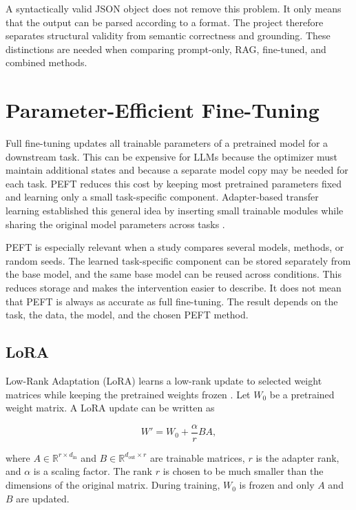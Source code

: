 A syntactically valid JSON object does not remove this problem. It only means that the output can be parsed according to a format. The project therefore separates structural validity from semantic correctness and grounding. These distinctions are needed when comparing prompt-only, RAG, fine-tuned, and combined methods.

\section{Parameter-Efficient Fine-Tuning}

Full fine-tuning updates all trainable parameters of a pretrained model for a downstream task. This can be expensive for LLMs because the optimizer must maintain additional states and because a separate model copy may be needed for each task. PEFT reduces this cost by keeping most pretrained parameters fixed and learning only a small task-specific component. Adapter-based transfer learning established this general idea by inserting small trainable modules while sharing the original model parameters across tasks \cite{houlsby2019adapter}.

PEFT is especially relevant when a study compares several models, methods, or random seeds. The learned task-specific component can be stored separately from the base model, and the same base model can be reused across conditions. This reduces storage and makes the intervention easier to describe. It does not mean that PEFT is always as accurate as full fine-tuning. The result depends on the task, the data, the model, and the chosen PEFT method.

\subsection{LoRA}

Low-Rank Adaptation (LoRA) learns a low-rank update to selected weight matrices while keeping the pretrained weights frozen \cite{hu2022lora}. Let \(W_0\) be a pretrained weight matrix. A LoRA update can be written as

\[
W' = W_0 + \frac{\alpha}{r}BA,
\]

where \(A \in \mathbb{R}^{r \times d_{\mathrm{in}}}\) and \(B \in \mathbb{R}^{d_{\mathrm{out}} \times r}\) are trainable matrices, \(r\) is the adapter rank, and \(\alpha\) is a scaling factor. The rank \(r\) is chosen to be much smaller than the dimensions of the original matrix. During training, \(W_0\) is frozen and only \(A\) and \(B\) are updated.

